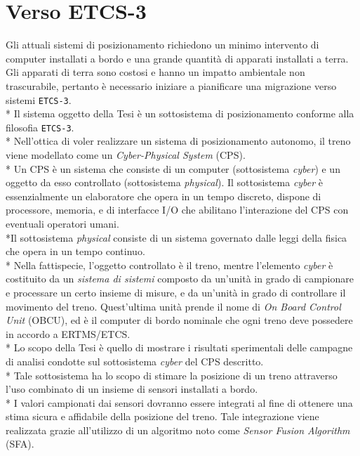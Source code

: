 \section{Verso ETCS-3}
Gli attuali sistemi di posizionamento richiedono un minimo intervento di computer installati a bordo e una grande quantit\`a di apparati installati a terra. Gli apparati di terra sono costosi e hanno un impatto ambientale non trascurabile, pertanto \`e necessario iniziare a pianificare una migrazione verso sistemi \texttt{ETCS-3}.\cite{market}\\*
Il sistema oggetto della Tesi \`e un sottosistema di posizionamento conforme alla filosofia \texttt{ETCS-3}.\\*
Nell'ottica di voler realizzare un sistema di posizionamento autonomo, il treno viene modellato come un \emph{Cyber-Physical System} (CPS).\\*
Un CPS \`e un sistema che consiste di un computer (sottosistema \emph{cyber}) e un oggetto da esso controllato (sottosistema \emph{physical}).
Il sottosistema \emph{cyber} \`e essenzialmente un elaboratore che opera in un tempo discreto, dispone di processore, memoria, e di interfacce I/O che abilitano l'interazione del CPS con eventuali operatori umani.\\*Il sottosistema \emph{physical} consiste di un sistema governato dalle leggi della fisica che opera in un tempo continuo.
\cite{cps}\cite{cecca}\\*
Nella fattispecie, l'oggetto controllato \`e il treno, mentre l'elemento \emph{cyber} \`e costituito da un \emph{sistema di sistemi} composto da un'unit\`a in grado di campionare e processare un certo insieme di misure, e da un'unit\`a in grado di controllare il movimento del treno. Quest'ultima unit\`a prende il nome di \emph{On Board Control Unit} (OBCU), ed \`e il computer di bordo nominale che ogni treno deve possedere in accordo a ERTMS/ETCS.\\*
Lo scopo della Tesi \`e quello di mostrare i risultati sperimentali delle campagne di analisi condotte sul sottosistema \emph{cyber} del CPS descritto.\\*
Tale sottosistema ha lo scopo di stimare la posizione di un treno attraverso l'uso combinato di un insieme di sensori installati a bordo.\\*
I valori campionati dai sensori dovranno essere integrati al fine di ottenere una stima sicura e affidabile della posizione del treno. Tale integrazione viene realizzata grazie all'utilizzo di un algoritmo noto come \emph{Sensor Fusion Algorithm} (SFA). \cite{sfarailway} 